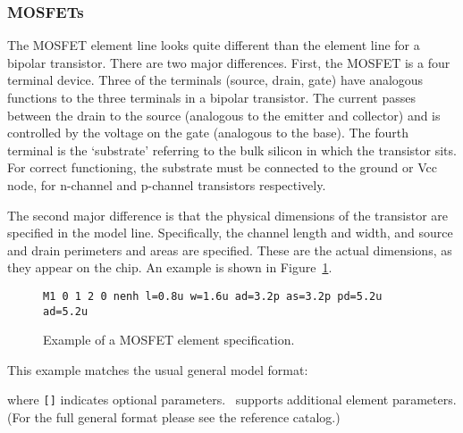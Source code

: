 \subsubsection{MOSFETs}

The MOSFET element line looks quite different than the element line
for a bipolar transistor.  There are two major differences.
First, the MOSFET is a four terminal device.
Three of the terminals (source, drain, gate) have analogous functions to
the three terminals
in a bipolar transistor.  The current
passes between the drain to the source (analogous to the emitter and
collector) and is controlled
by the voltage on the gate (analogous to the base).
The fourth terminal is the `substrate' referring
to the bulk silicon in which the transistor
sits.  For correct functioning, the
substrate must be connected to the ground or Vcc node, for
n-channel and p-channel transistors respectively.

The second major difference is that the physical dimensions of the
transistor are specified in the model line.
Specifically, the channel length and width, and source and drain perimeters
and areas are specified.  These are the actual
dimensions, as they appear on the chip.  An example is shown in
Figure~\ref{mos-ex}.
%
\begin{figure}
\centerline{}
\par\noindent
\centerline{\tt M1 0 1 2 0 nenh l=0.8u w=1.6u ad=3.2p as=3.2p pd=5.2u ad=5.2u}
\caption{Example of a MOSFET element specification.}
\label{mos-ex}
\end{figure}
%
This example matches the usual general model format:
\par\noindent
where {\tt []} indicates optional parameters.
{\pspice\ supports additional element parameters.
(For the full general format please see the reference catalog.)}

